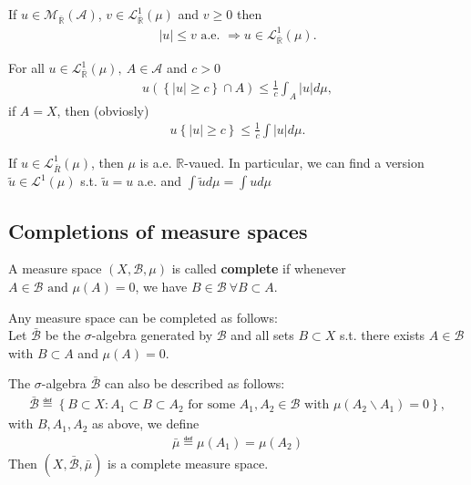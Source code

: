 \begin{corollary}
    If \(u\in\mathcal{M}_{\overline{\mathbb{R}}}(\mathscr{A})\), \(v\in\mathcal{L}^{1}_{\overline{\mathbb{R}}}(\mu)\) and \(v\geq0\) then
    \begin{align}
        \vert u\vert \leq v \text{ a.e. } \Rightarrow u\in\mathcal{L}^{1}_{\overline{\mathbb{R}}}(\mu).
    \end{align}
\end{corollary}
\begin{proposition}
    For all \(u\in\mathcal{L}^{1}_{\overline{\mathbb{R}}}(\mu), \ A\in\mathscr{A}\) and \(c>0\)
    \begin{align}
        u\left(\left\{ \vert u\vert \geq c \right\} \cap A\right) \leq \frac{1}{c}\int_{A}\vert u\vert d\mu,
    \end{align}
    if \(A=X\), then (obviosly)
    \begin{align}
        u\left\{ \vert u\vert \geq c \right\} \leq \frac{1}{c}\int \vert u\vert d\mu.
    \end{align}
\end{proposition}    
\ifdetailed
\begin{corollary}
    If \(u\in\mathcal{L}^{1}_{\overline{R}}(\mu)\), then \(\mu\) is a.e. \(\mathbb{R}\)-vaued. In particular, we can find a version
    \(\tilde{u}\in \mathcal{L}^{1}(\mu)\) s.t. \(\tilde{u}=u\) a.e. and \(\int\tilde{u}d\mu = \int ud\mu\)
\end{corollary}
\fi

\subsection*{Completions of measure spaces}
\begin{definition}
    A measure space \(\left(X,\mathscr{B}, \mu\right)\) is called \textbf{complete} if whenever \(A\in\mathscr{B} \text{ and } \mu(A) =0\), we have \(B\in\mathscr{B} \ \forall B\subset A\).
\end{definition}
\begin{remark}
    Any measure space can be completed as follows: \\ 
    Let \(\bar{\mathscr{B}}\) be the \(\sigma\)-algebra generated by \(\mathscr{B}\) and all sets \(B\subset X\) s.t. there exists \(A\in\mathscr{B}\)
    with \(B\subset A\) and \(\mu(A)=0\).
\end{remark}
\begin{proposition}
    The \(\sigma\)-algebra \(\bar{\mathscr{B}}\) can also be described as follows:
    \begin{align}
        \bar{\mathscr{B}} \eqdef \left\{ B\subset X: A_1\subset B\subset A_2\text{ for some }A_1,A_2\in\mathscr{B}\text{ with }\mu(A_2\backslash A_1)=0 \right\},
    \end{align}
    with \(B,A_1,A_2 \) as above, we define 
    \begin{align}
        \bar{\mu} \eqdef \mu(A_1) = \mu(A_2)
    \end{align}
    Then \(\left( X,\bar{\mathscr{B}}, \bar{\mu} \right)\) is a complete measure space.
\end{proposition}

